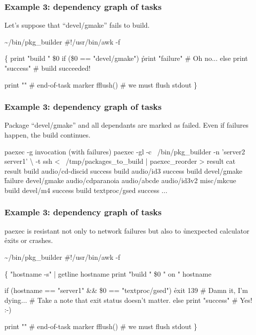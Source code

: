 \documentclass[hyperref={colorlinks=true}]{beamer}
\begin{document}
\begin{frame}[fragile]
  \frametitle{Example 3: dependency graph of tasks}
Let's suppose that ``devel/gmake'' fails to build.

  \begin{block}{}
      \begin{CodeSmall}{\~{}/bin/pkg\_builder}
#!/usr/bin/awk -f

\{
   print "build " \$0
   if (\$0 == "devel/gmake")
      \h{print "failure"} # Oh no...
   else
      print "success" # build succeeded!

   print ""        # end-of-task marker
   fflush()        # we must flush stdout
\}
      \end{CodeSmall}
  \end{block}
\end{frame}

\begin{frame}[fragile]
  \frametitle{Example 3: dependency graph of tasks}
Package ``devel/gmake'' and all dependants are marked as failed.
Even if failures happen, the build continues.
  \begin{block}{}
      \begin{CodeSmall}{paexec -g invocation (with failures)}
\prompt{\$} paexec -gl -c ~/bin/pkg_builder -n 'server2 server1' \textbackslash
    -t ssh < ~/tmp/packages_to_build | paexec_reorder > result
\prompt{\$} cat result
build audio/cd-discid
success
build audio/id3
success
build devel/gmake
\h{failure}
\h{devel/gmake audio/cdparanoia audio/abcde audio/id3v2 misc/mkcue}
build devel/m4
success
build textproc/gsed
success
...
\prompt{\$}
      \end{CodeSmall}
  \end{block}
\end{frame}

\begin{frame}[fragile]
  \frametitle{Example 3: dependency graph of tasks}
paexec is resistant not only to network failures but also to
\h{unexpected} calculator \h{exits or crashes}.
  \begin{block}{}
      \begin{CodeSmall}{\~{}/bin/pkg\_builder}
#!/usr/bin/awk -f

\{
   "hostname -s" | getline hostname
   print "build " \$0 " on " hostname

   if (hostname == "server1" && \$0 == "textproc/gsed")
      \h{exit 139}
      # Damn it, I'm dying...
      # Take a note that exit status doesn't matter.
   else
      print "success" # Yes! :-)

   print ""        # end-of-task marker
   fflush()        # we must flush stdout
\}
      \end{CodeSmall}
  \end{block}
\end{frame}
\end{document}
